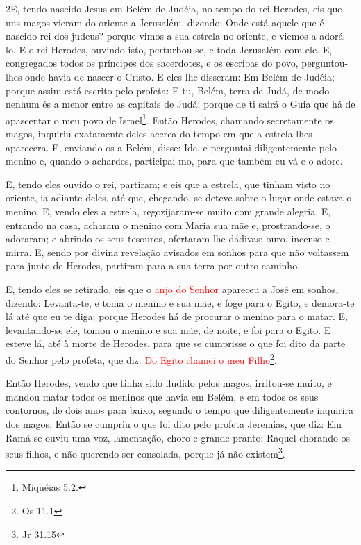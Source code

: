 \medskip

\lettrine{2} E, tendo nascido Jesus em Belém de Judéia, no
tempo do rei Herodes, eis que uns magos vieram do oriente a
Jerusalém, dizendo: Onde está aquele que é nascido rei dos
judeus? porque vimos a sua estrela no oriente, e viemos a adorá-lo.
E o rei Herodes, ouvindo isto, perturbou-se, e toda Jerusalém
com ele. E, congregados todos os príncipes dos sacerdotes, e os
escribas do povo, perguntou-lhes onde havia de nascer o Cristo.
E eles lhe disseram: Em Belém de Judéia; porque assim está
escrito pelo profeta: E tu, Belém, terra de Judá, de modo nenhum
és a menor entre as capitais de Judá; porque de ti sairá o Guia que
há de apascentar o meu povo de Israel\footnote{Miquéias 5.2.}.
Então Herodes, chamando secretamente os magos, inquiriu
exatamente deles acerca do tempo em que a estrela lhes aparecera.
E, enviando-os a Belém, disse: Ide, e perguntai diligentemente
pelo menino e, quando o achardes, participai-mo, para que também eu
vá e o adore.

E, tendo eles ouvido o rei, partiram; e eis que a estrela, que
tinham visto no oriente, ia adiante deles, até que, chegando, se
deteve sobre o lugar onde estava o menino. E, vendo eles a
estrela, regozijaram-se muito com grande alegria. E, entrando
na casa, acharam o menino com Maria sua mãe e, prostrando-se, o
adoraram; e abrindo os seus tesouros, ofertaram-lhe dádivas: ouro,
incenso e mirra. E, sendo por divina revelação avisados em
sonhos para que não voltassem para junto de Herodes, partiram para a
sua terra por outro caminho.

E, tendo eles se retirado, eis que o \textcolor{red}{anjo do Senhor}
apareceu a José em sonhos, dizendo: Levanta-te, e toma o menino e
sua mãe, e foge para o Egito, e demora-te lá até que eu te diga;
porque Herodes há de procurar o menino para o matar. E,
levantando-se ele, tomou o menino e sua mãe, de noite, e foi para o
Egito. E esteve lá, até à morte de Herodes, para que se
cumprisse o que foi dito da parte do Senhor pelo profeta, que diz:
\textcolor{red}{Do Egito chamei o meu Filho}\footnote{Os 11.1}.

Então Herodes, vendo que tinha sido iludido pelos magos,
irritou-se muito, e mandou matar todos os meninos que havia em
Belém, e em todos os seus contornos, de dois anos para baixo,
segundo o tempo que diligentemente inquirira dos magos. Então
se cumpriu o que foi dito pelo profeta Jeremias, que diz: Em
Ramá se ouviu uma voz, lamentação, choro e grande pranto: Raquel
chorando os seus filhos, e não querendo ser consolada, porque já não
existem\footnote{Jr 31.15}.

